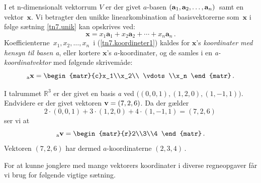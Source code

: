 \begin{definition}
I et n-dimensionalt vektorrum $V$ er der givet $a$-basen $(\mathbf a_1,\mathbf a_2,\ldots,\mathbf{a}_n)\,$ samt en vektor $\,\mathbf x$. Vi betragter den unikke linearkombination af basisvektorerne som $\,\mathbf x$ i følge sætning \ref{tn7.unik} kan opskrives ved:
\begin{equation}\label{tn7.koordineter1}
\mathbf x=x_1\mathbf a_1+x_2\mathbf a_2+\cdots +x_n\mathbf a_n\,.
\end{equation}
Koefficienterne $\,x_1,x_2,\ldots,x_n\,$ i (\ref{tn7.koordineter1}) kaldes for $\mathbf x$'s \textit{koordinater med hensyn til basen a}, eller kortere $\mathbf x$'s $a$-koordinater, og de samles i en \textit{a-koordinatvektor} med følgende skrivemåde:
\begin{equation}
_\mathrm a\mathbf x=
\begin{matr}{c}x_1\\x_2\\ \vdots \\x_n \end{matr}\,.
\end{equation}
\end{definition}

\begin{example}
I talrummet $\mathbb R^3$ er der givet en basis \textit{a} ved $\big((0,0,1),(1,2,0),(1,-1,1)\big)$. Endvidere er der givet vektoren $\mathbf{v}=(7,2,6)$. Da der gælder
$$2\cdot(0,0,1)+3\cdot(1,2,0)+4\cdot(1,-1,1)=(7,2,6)\,$$
ser vi at
$$
_\mathrm a\mathbf v=\begin{matr}{r}2\\3\\4 \end{matr}\,.
$$
Vektoren $(7,2,6)$ har dermed $a$-koordinaterne $(2,3,4)\,$.
\end{example}

For at kunne jonglere med mange vektorers koordinater i diverse regneopgaver får vi brug for følgende vigtige sætning.

